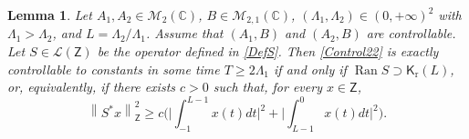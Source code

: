 \documentclass[10pt]{article}
\theoremstyle{plain}
\newtheorem{lemm}[theo]{Lemma}
\theoremstyle{definition}
\DeclareMathOperator{\range}{Ran}
\newcommand{\norm}[1]{\left\lVert #1\right\lVert}
\newcommand{\bgabs}[1]{\biggl\lvert #1\biggr \rvert}
\numberwithin{equation}{section}\numberwithin{figure}{section}\emergencystretch=3em
\begin{document}
\begin{lemm}
\label{LemmIneqObservS}
Let $A_1, A_2 \in \mathcal M_2(\mathbb C)$, $B \in \mathcal M_{2, 1}(\mathbb C)$, $(\Lambda_1, \Lambda_2) \in (0, +\infty)^2$ with $\Lambda_1 > \Lambda_2$, and $L = \Lambda_2 / \Lambda_1$. Assume that $(A_1, B)$ and $(A_2, B)$ are controllable. Let $S \in \mathcal L(\mathsf Z)$ be the operator defined in \eqref{DefS}. Then \eqref{Control22} is exactly controllable to constants in some time $T \geq 2 \Lambda_1$ if and only if $\range S \supset \mathsf K_{\mathrm r}(L)$, or, equivalently, if there exists $c > 0$ such that, for every $x \in \mathsf Z$,
\begin{equation}
\label{IneqObservS}
\norm{S^\ast x}_{\mathsf Z}^2 \geq c \biggl(\bgabs{\int_{-1}^{L-1} x(t) dt}^2 + \bgabs{\int_{L-1}^{0} x(t) dt}^2\biggr).
\end{equation}
\end{lemm}
\end{document}
